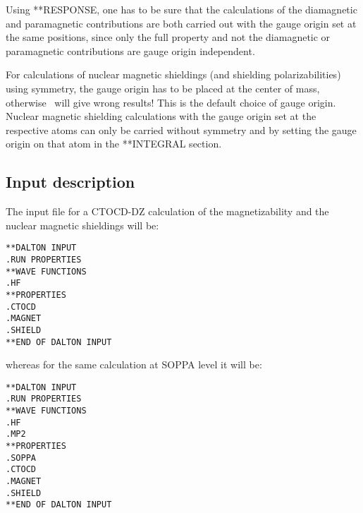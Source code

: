 Using **RESPONSE, one has to be sure that the calculations of the diamagnetic
and paramagnetic contributions are both carried out with the gauge origin set
at the same positions, since only the full property and not the diamagnetic or
paramagnetic contributions are gauge origin independent.

For calculations of nuclear magnetic shieldings (and shielding
polarizabilities) using symmetry, the gauge origin has to be placed at the
center of mass, otherwise \dalton\ will give wrong results! This is the
default choice of gauge origin. Nuclear magnetic
shielding calculations with the gauge origin set at the respective atoms can
only be carried without symmetry and by setting the gauge origin on that atom
in the **INTEGRAL section. 

\subsection{Input description}\label{sec:ctocdinput}

\begin{center}
\end{center}

The input file for a CTOCD-DZ calculation of the magnetizability and
the nuclear magnetic shieldings will be:

\begin{verbatim}
**DALTON INPUT
.RUN PROPERTIES
**WAVE FUNCTIONS
.HF
**PROPERTIES
.CTOCD
.MAGNET
.SHIELD
**END OF DALTON INPUT
\end{verbatim}
whereas for the same calculation at SOPPA level it will be:

\begin{verbatim}
**DALTON INPUT
.RUN PROPERTIES
**WAVE FUNCTIONS
.HF
.MP2
**PROPERTIES
.SOPPA
.CTOCD
.MAGNET
.SHIELD
**END OF DALTON INPUT
\end{verbatim}

